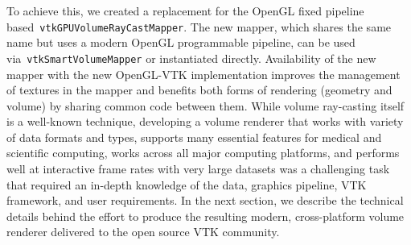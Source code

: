 To achieve this, we created a replacement for the OpenGL fixed pipeline
based~\texttt{vtkGPUVolumeRayCastMapper}. The new mapper, which shares the same
name but uses a modern OpenGL programmable pipeline, can be used
via~\texttt{vtkSmartVolumeMapper} or instantiated directly. Availability of the
new mapper with the new OpenGL-VTK implementation improves the management of
textures in the mapper and benefits both forms of rendering (geometry and
volume) by sharing common code between them. While volume ray-casting itself is
a well-known technique, developing a volume renderer that works with variety of
data formats and types, supports many essential features for medical and
scientific computing, works across all major computing platforms, and performs
well at interactive frame rates with very large datasets was a challenging task
that required an in-depth knowledge of the data, graphics pipeline, VTK
framework, and user requirements.  In the next section, we describe the
technical details behind the effort to produce the resulting modern,
cross-platform volume renderer delivered to the open source VTK community.

